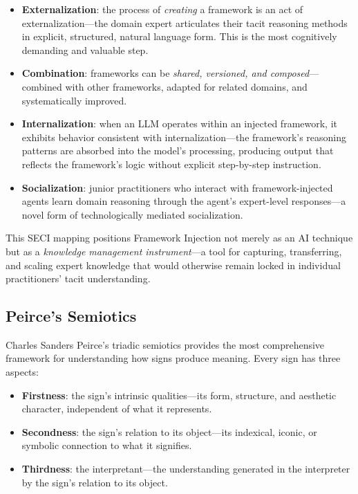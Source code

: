 \documentclass[12pt,a4paper]{article}
\begin{document}
\begin{itemize}
  \item \textbf{Externalization}: the process of \emph{creating} a framework is an act of externalization---the domain expert articulates their tacit reasoning methods in explicit, structured, natural language form. This is the most cognitively demanding and valuable step.
  \item \textbf{Combination}: frameworks can be \emph{shared, versioned, and composed}---combined with other frameworks, adapted for related domains, and systematically improved.
  \item \textbf{Internalization}: when an LLM operates within an injected framework, it exhibits behavior consistent with internalization---the framework's reasoning patterns are absorbed into the model's processing, producing output that reflects the framework's logic without explicit step-by-step instruction.
  \item \textbf{Socialization}: junior practitioners who interact with framework-injected agents learn domain reasoning through the agent's expert-level responses---a novel form of technologically mediated socialization.
\end{itemize}

This SECI mapping positions Framework Injection not merely as an AI technique but as a \emph{knowledge management instrument}---a tool for capturing, transferring, and scaling expert knowledge that would otherwise remain locked in individual practitioners' tacit understanding.

\subsection{Peirce's Semiotics}

Charles Sanders Peirce's triadic semiotics \cite{peirce1931} provides the most comprehensive framework for understanding how signs produce meaning. Every sign has three aspects:

\begin{itemize}
  \item \textbf{Firstness}: the sign's intrinsic qualities---its form, structure, and aesthetic character, independent of what it represents.
  \item \textbf{Secondness}: the sign's relation to its object---its indexical, iconic, or symbolic connection to what it signifies.
  \item \textbf{Thirdness}: the interpretant---the understanding generated in the interpreter by the sign's relation to its object.
\end{itemize}
\end{document}

